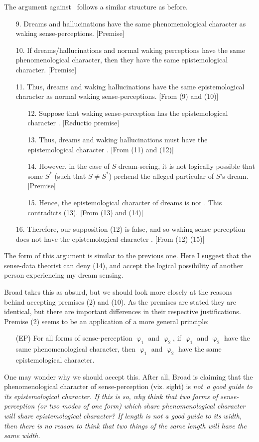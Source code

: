 The argument against \PRS\ follows a similar structure as before.
\begin{enumerate}

\item[9.]Dreams and hallucinations have the same phenomenological character as waking sense-perceptions. [Premise]
\item[10.]If dreams/hallucinations and normal waking perceptions have the same phenomenological character, then they have the same epistemological character. [Premise]
\item[11.]Thus, dreams and waking hallucinations have the same epistemological character as normal waking sense-perceptions. [From (9) and (10)]
\begin{enumerate}
\item[12.]Suppose that waking sense-perception has the epistemological character \PRS. [Reductio premise]
\item[13.]Thus, dreams and waking hallucinations must have the epistemological character \PRS. [From (11) and (12)]
\item[14.]However, in the case of $S$ dream-seeing, it is not logically possible that some $S^*$ (such that $S\neq S^*$) prehend the alleged particular of $S$'s dream. [Premise]
\item[15.]Hence, the epistemological character of dreams is not \PRS. This contradicts (13). [From (13) and (14)]
\end{enumerate}
\item[16.]Therefore, our supposition (12) is false, and so waking sense-perception does not have the epistemological character \PRS. [From (12)-(15)]

\end{enumerate}
The form of this argument is similar to the previous one. Here I suggest that the sense-data theorist can deny (14), and accept the logical possibility of another person experiencing my dream sensing. 

Broad takes this as absurd, but we should look more closely at the reasons behind accepting premises (2) and (10). As the premises are stated they are identical, but there are important differences in their respective justifications. Premise (2) seems to be an application of a more general principle:
\begin{enumerate}

\item[(EP)] For all forms of sense-perception $\upvarphi_1$ and $\upvarphi_2$, if $\upvarphi_1$ and $\upvarphi_2$ have the same phenomenological character, then $\upvarphi_1$ and $\upvarphi_2$ have the same epistemological character.

\end{enumerate}
One may wonder why we should accept this. After all, Broad is claiming that the phenomenological character of sense-perception (viz. sight) is \em not\em\ a good guide to its epistemological character. If this is so, why think that two forms of sense-perception (or two modes of one form) which share phenomenological character will share epistemological character? If length is not a good guide to its width, then there is no reason to think that two things of the same length will have the same width. 

